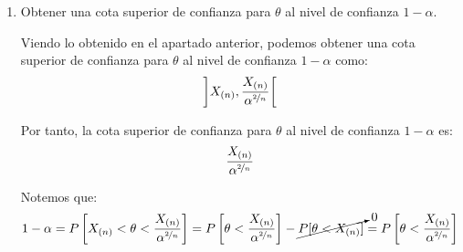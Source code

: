 \begin{ejercicio}[de Examen]
\begin{enumerate}
        Por tanto, la cota inferior de confianza para $\theta$ al nivel de confianza $1 - \alpha$ es:
        \begin{align*}
            \dfrac{X_{(n)}}{(1-\alpha)^{\nicefrac{2}{n}}}
        \end{align*}

        \item Obtener una cota superior de confianza para $\theta$ al nivel de confianza $1 - \alpha$.
        
        Viendo lo obtenido en el apartado anterior, podemos obtener una cota superior de confianza para $\theta$ al nivel de confianza $1 - \alpha$ como:
        \begin{align*}
            \left]X_{(n)}, \dfrac{X_{(n)}}{\alpha^{\nicefrac{2}{n}}}\right[
        \end{align*}

        Por tanto, la cota superior de confianza para $\theta$ al nivel de confianza $1 - \alpha$ es:
        \begin{align*}
            \dfrac{X_{(n)}}{\alpha^{\nicefrac{2}{n}}}
        \end{align*}

        Notemos que:
        \begin{equation*}
            1-\alpha = P\left[X_{(n)} < \theta < \dfrac{X_{(n)}}{\alpha^{\nicefrac{2}{n}}}\right] = P\left[\theta< \dfrac{X_{(n)}}{\alpha^{\nicefrac{2}{n}}}\right] - \cancelto{0}{P[\theta < X_{(n)}]} =P\left[\theta< \dfrac{X_{(n)}}{\alpha^{\nicefrac{2}{n}}}\right]
        \end{equation*}
    \end{enumerate}
\end{ejercicio}

